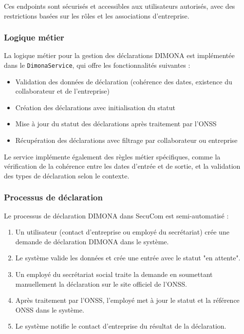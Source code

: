 \documentclass[12pt,a4paper]{report}
\begin{document}
Ces endpoints sont sécurisés et accessibles aux utilisateurs autorisés, avec des restrictions basées sur les rôles et les associations d'entreprise.

\subsubsection{Logique métier}

La logique métier pour la gestion des déclarations DIMONA est implémentée dans le \texttt{DimonaService}, qui offre les fonctionnalités suivantes :

\begin{itemize}
  \item Validation des données de déclaration (cohérence des dates, existence du collaborateur et de l'entreprise)
  \item Création des déclarations avec initialisation du statut
  \item Mise à jour du statut des déclarations après traitement par l'ONSS
  \item Récupération des déclarations avec filtrage par collaborateur ou entreprise
\end{itemize}

Le service implémente également des règles métier spécifiques, comme la vérification de la cohérence entre les dates d'entrée et de sortie, et la validation des types de déclaration selon le contexte.

\subsubsection{Processus de déclaration}

Le processus de déclaration DIMONA dans SecuCom est semi-automatisé :

\begin{enumerate}
  \item Un utilisateur (contact d'entreprise ou employé du secrétariat) crée une demande de déclaration DIMONA dans le système.
  \item Le système valide les données et crée une entrée avec le statut "en attente".
  \item Un employé du secrétariat social traite la demande en soumettant manuellement la déclaration sur le site officiel de l'ONSS.
  \item Après traitement par l'ONSS, l'employé met à jour le statut et la référence ONSS dans le système.
  \item Le système notifie le contact d'entreprise du résultat de la déclaration.
\end{enumerate}
\end{document}
